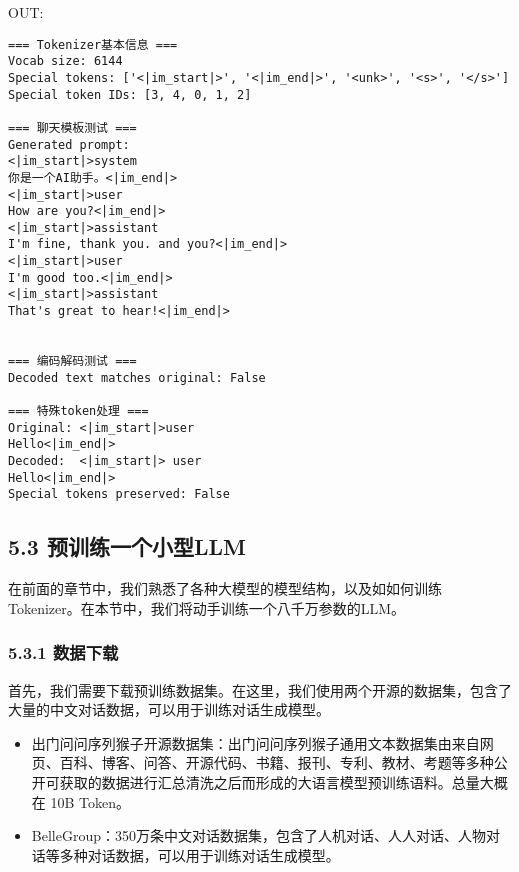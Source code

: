 \documentclass[
]{article}
\begin{document}
OUT:

\begin{verbatim}
=== Tokenizer基本信息 ===
Vocab size: 6144
Special tokens: ['<|im_start|>', '<|im_end|>', '<unk>', '<s>', '</s>']
Special token IDs: [3, 4, 0, 1, 2]

=== 聊天模板测试 ===
Generated prompt:
<|im_start|>system
你是一个AI助手。<|im_end|>
<|im_start|>user
How are you?<|im_end|>
<|im_start|>assistant
I'm fine, thank you. and you?<|im_end|>
<|im_start|>user
I'm good too.<|im_end|>
<|im_start|>assistant
That's great to hear!<|im_end|>


=== 编码解码测试 ===
Decoded text matches original: False

=== 特殊token处理 ===
Original: <|im_start|>user
Hello<|im_end|>
Decoded:  <|im_start|> user
Hello<|im_end|>
Special tokens preserved: False
\end{verbatim}

\subsection{5.3
预训练一个小型LLM}\label{ux9884ux8badux7ec3ux4e00ux4e2aux5c0fux578bllm}

在前面的章节中，我们熟悉了各种大模型的模型结构，以及如如何训练Tokenizer。在本节中，我们将动手训练一个八千万参数的LLM。

\subsubsection{5.3.1 数据下载}\label{ux6570ux636eux4e0bux8f7d}

首先，我们需要下载预训练数据集。在这里，我们使用两个开源的数据集，包含了大量的中文对话数据，可以用于训练对话生成模型。

\begin{itemize}
\item
  出门问问序列猴子开源数据集：出门问问序列猴子通用文本数据集由来自网页、百科、博客、问答、开源代码、书籍、报刊、专利、教材、考题等多种公开可获取的数据进行汇总清洗之后而形成的大语言模型预训练语料。总量大概在
  10B Token。
\item
  BelleGroup：350万条中文对话数据集，包含了人机对话、人人对话、人物对话等多种对话数据，可以用于训练对话生成模型。
\end{itemize}
\end{document}

